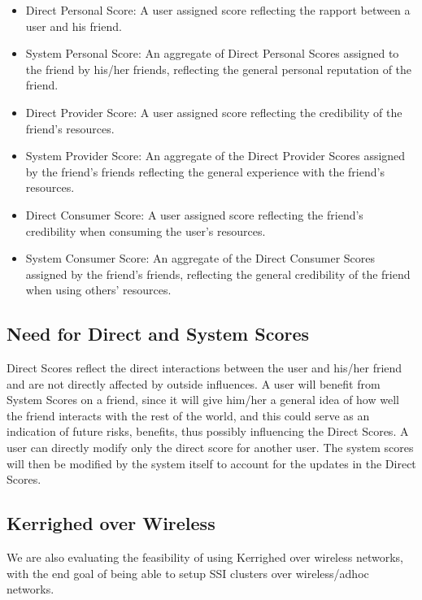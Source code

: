 \documentclass[10pt, conference, compsocconf]{IEEEtran}
\begin{document}
\begin{itemize}
\item Direct Personal Score: A user assigned score reflecting
the rapport between a user and his friend.

\item System Personal Score: An aggregate of Direct Personal
Scores assigned to the friend by his/her friends,
reflecting the general personal reputation of the friend.

\item Direct Provider Score: A user assigned score reflecting
the credibility of the friend's resources.

\item System Provider Score: An aggregate of the Direct Provider
Scores assigned by the friend's friends reflecting the
general experience with the friend's resources.

\item Direct Consumer Score: A user assigned score reflecting
the friend’s credibility when consuming the user’s resources.

\item System Consumer Score: An aggregate of the Direct Consumer
Scores assigned by the friend's friends, reflecting the
general credibility of the friend when using others' resources.

\end{itemize}
        
\subsection{Need for Direct and System Scores}
Direct Scores reflect the direct interactions between the
user and his/her friend and are not directly affected by
outside influences. A user will benefit from System Scores
on a friend, since it will give him/her a general idea
of how well the friend interacts with the rest of the world,
and this could serve as an indication of future risks,
benefits, thus possibly influencing the Direct Scores.
A user can directly modify only the direct score for another
user. The system scores will then be modified by the
system itself to account for the updates in the Direct Scores.

\subsection{Kerrighed over Wireless}
We are also evaluating the feasibility of using Kerrighed
over wireless networks, with the end goal of being able
to setup SSI clusters over wireless/adhoc networks.
\end{document}
